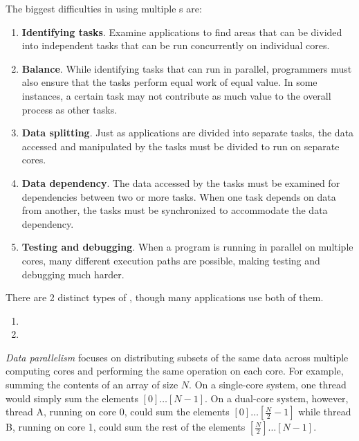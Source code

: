 The biggest difficulties in using multiple s are:
\begin{enumerate}[noitemsep]
\item \textbf{Identifying tasks}.
  Examine applications to find areas that can be divided into independent tasks that can be run concurrently on individual cores.
\item \textbf{Balance}.
  While identifying tasks that can run in parallel, programmers must also ensure that the tasks perform equal work of equal value.
  In some instances, a certain task may not contribute as much value to the overall process as other tasks.
\item \textbf{Data splitting}.
  Just as applications are divided into separate tasks, the data accessed and manipulated by the tasks must be divided to run on separate cores.
\item \textbf{Data dependency}.
  The data accessed by the tasks must be examined for dependencies between two or more tasks.
  When one task depends on data from another, the tasks must be synchronized to accommodate the data dependency.
\item \textbf{Testing and debugging}.
  When a program is running in parallel on multiple cores, many different execution paths are possible, making testing and debugging much harder.
\end{enumerate}

There are 2 distinct types of , though many applications use both of them.
\begin{enumerate}[noitemsep]
\item {}
\item {}
\end{enumerate}

\begin{definition}\label{def:Data_Parallelism}
  \emph{Data parallelism} focuses on distributing subsets of the same data across multiple computing cores and performing the same operation on each core.
  For example, summing the contents of an array of size $N$.
  On a single-core system, one thread would simply sum the elements $[0] \ldots [N − 1]$.
  On a dual-core system, however, thread A, running on core 0, could sum the elements $[0] \ldots [\frac{N}{2} − 1]$ while thread B, running on core 1, could sum the rest of the elements $[\frac{N}{2}] \ldots [N − 1]$.
\end{definition}

